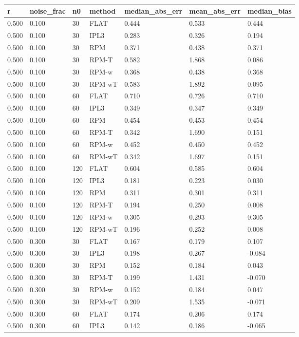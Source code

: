 \begin{tabular}{lllllll}
\hline
r & noise\_frac & n0 & method & median\_abs\_err & mean\_abs\_err & median\_bias \\
\hline
0.500 & 0.100 & 30 & FLAT & 0.444 & 0.533 & 0.444 \\
0.500 & 0.100 & 30 & IPL3 & 0.283 & 0.326 & 0.194 \\
0.500 & 0.100 & 30 & RPM & 0.371 & 0.438 & 0.371 \\
0.500 & 0.100 & 30 & RPM-T & 0.582 & 1.868 & 0.086 \\
0.500 & 0.100 & 30 & RPM-w & 0.368 & 0.438 & 0.368 \\
0.500 & 0.100 & 30 & RPM-wT & 0.583 & 1.892 & 0.095 \\
0.500 & 0.100 & 60 & FLAT & 0.710 & 0.726 & 0.710 \\
0.500 & 0.100 & 60 & IPL3 & 0.349 & 0.347 & 0.349 \\
0.500 & 0.100 & 60 & RPM & 0.454 & 0.453 & 0.454 \\
0.500 & 0.100 & 60 & RPM-T & 0.342 & 1.690 & 0.151 \\
0.500 & 0.100 & 60 & RPM-w & 0.452 & 0.450 & 0.452 \\
0.500 & 0.100 & 60 & RPM-wT & 0.342 & 1.697 & 0.151 \\
0.500 & 0.100 & 120 & FLAT & 0.604 & 0.585 & 0.604 \\
0.500 & 0.100 & 120 & IPL3 & 0.181 & 0.223 & 0.030 \\
0.500 & 0.100 & 120 & RPM & 0.311 & 0.301 & 0.311 \\
0.500 & 0.100 & 120 & RPM-T & 0.194 & 0.250 & 0.008 \\
0.500 & 0.100 & 120 & RPM-w & 0.305 & 0.293 & 0.305 \\
0.500 & 0.100 & 120 & RPM-wT & 0.196 & 0.252 & 0.008 \\
0.500 & 0.300 & 30 & FLAT & 0.167 & 0.179 & 0.107 \\
0.500 & 0.300 & 30 & IPL3 & 0.198 & 0.267 & -0.084 \\
0.500 & 0.300 & 30 & RPM & 0.152 & 0.184 & 0.043 \\
0.500 & 0.300 & 30 & RPM-T & 0.199 & 1.431 & -0.070 \\
0.500 & 0.300 & 30 & RPM-w & 0.152 & 0.184 & 0.047 \\
0.500 & 0.300 & 30 & RPM-wT & 0.209 & 1.535 & -0.071 \\
0.500 & 0.300 & 60 & FLAT & 0.174 & 0.206 & 0.174 \\
0.500 & 0.300 & 60 & IPL3 & 0.142 & 0.186 & -0.065 \\

\end{tabular}
